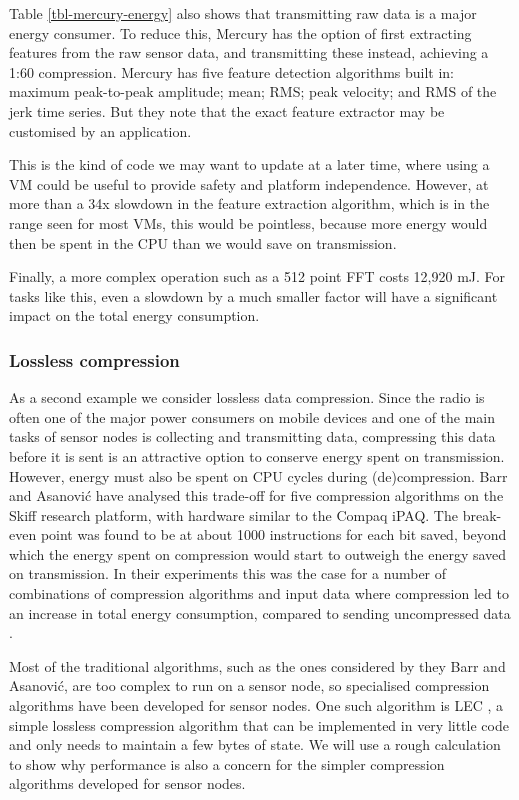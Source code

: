 Table \ref{tbl-mercury-energy} also shows that transmitting raw data is a major energy consumer. To reduce this, Mercury has the option of first extracting features from the raw sensor data, and transmitting these instead, achieving a 1:60 compression. Mercury has five feature detection algorithms built in: maximum peak-to-peak amplitude; mean; RMS; peak velocity; and RMS of the jerk time series. But they note that the exact feature extractor may be customised by an application.

This is the kind of code we may want to update at a later time, where using a VM could be useful to provide safety and platform independence. However, at more than a 34x slowdown in the feature extraction algorithm, which is in the range seen for most VMs, this would be pointless, because more energy would then be spent in the CPU than we would save on transmission.

Finally, a more complex operation such as a 512 point FFT costs 12,920 mJ. For tasks like this, even a slowdown by a much smaller factor will have a significant impact on the total energy consumption.

\subsubsection{Lossless compression}
As a second example we consider lossless data compression. Since the radio is often one of the major power consumers on mobile devices and one of the main tasks of sensor nodes is collecting and transmitting data, compressing this data before it is sent is an attractive option to conserve energy spent on transmission. However, energy must also be spent on CPU cycles during (de)compression. Barr and Asanovi\'c have analysed this trade-off for five compression algorithms on the Skiff research platform, with hardware similar to the Compaq iPAQ. The break-even point was found to be at about 1000 instructions for each bit saved, beyond which the energy spent on compression would start to outweigh the energy saved on transmission. In their experiments this was the case for a number of combinations of compression algorithms and input data where compression led to an increase in total energy consumption, compared to sending uncompressed data \cite{Barr:2006vg}.

Most of the traditional algorithms, such as the ones considered by they Barr and Asanovi\'c, are too complex to run on a sensor node, so specialised compression algorithms have been developed for sensor nodes. One such algorithm is LEC \cite{Marcelloni:2009ja}, a simple lossless compression algorithm that can be implemented in very little code and only needs to maintain a few bytes of state. We will use a rough calculation to show why performance is also a concern for the simpler compression algorithms developed for sensor nodes.

